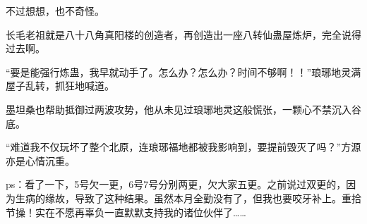 \begin{this_body}
不过想想，也不奇怪。

长毛老祖就是八十八角真阳楼的创造者，再创造出一座八转仙蛊屋炼炉，完全说得过去啊。

“要是能强行炼蛊，我早就动手了。怎么办？怎么办？时间不够啊！！”琅琊地灵满屋子乱转，抓狂地喊道。

墨坦桑也帮助抵御过两波攻势，他从未见过琅琊地灵这般慌张，一颗心不禁沉入谷底。

“难道我不仅玩坏了整个北原，连琅琊福地都被我影响到，要提前毁灭了吗？”方源亦是心情沉重。

ps：看了一下，5号欠一更，6号7号分别两更，欠大家五更。之前说过双更的，因为生病的缘故，导致了这种结果。虽然本月全勤没有了，但我也要咬牙补上。重拾节操！实在不愿再辜负一直默默支持我的诸位伙伴了……

\end{this_body}

